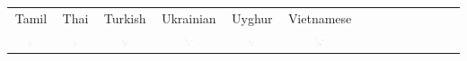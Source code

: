 \documentclass[11pt,letterpaper]{article}
\begin{document}
\begin{tabular}{cccccccccccccc}
\\
Tamil & Thai & Turkish & Ukrainian & Uyghur & Vietnamese \\
\includegraphics[width=0.14\textwidth]{figures/Tamil-listener-surprisal-memory.pdf} & \includegraphics[width=0.14\textwidth]{figures/Thai-Adap-listener-surprisal-memory.pdf} & \includegraphics[width=0.14\textwidth]{figures/Turkish-listener-surprisal-memory.pdf} & \includegraphics[width=0.14\textwidth]{figures/Ukrainian-listener-surprisal-memory.pdf} & \includegraphics[width=0.14\textwidth]{figures/Uyghur-Adap-listener-surprisal-memory.pdf} & \includegraphics[width=0.14\textwidth]{figures/Vietnamese-listener-surprisal-memory.pdf}
\\\end{tabular}
\end{document}
